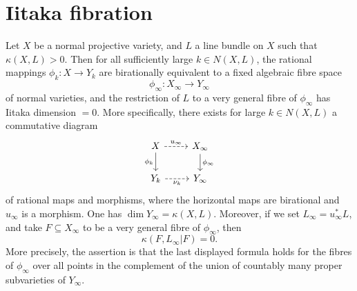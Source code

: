 \section{Iitaka fibration}

    \begin{theorem}\label{thm:Iitaka_fibration}
        Let \( X \) be a normal projective variety, and \( L \) a line bundle on \( X \) such that \( \kappa(X,L) > 0 \). Then for all sufficiently large \( k \in N(X,L) \), the rational mappings \( \phi_k : X \rightarrow Y_k \) are birationally equivalent to a fixed algebraic fibre space
        \[
        \phi_{\infty} : X_{\infty} \rightarrow Y_{\infty}
        \]
        of normal varieties, and the restriction of \( L \) to a very general fibre of \( \phi_{\infty} \) has Iitaka dimension \( = 0 \). More specifically, there exists for large \( k \in N(X,L) \) a commutative diagram
        \[
        \begin{tikzcd}
        X \arrow[d, "\phi_k"'] \arrow[r, dashed, "u_{\infty}"] & X_{\infty} \arrow[d, "\phi_{\infty}"] \\
        Y_k \arrow[r, dashed, "\nu_k"'] & Y_{\infty}
        \end{tikzcd}
        \]
        of rational maps and morphisms, where the horizontal maps are birational and \( u_{\infty} \) is a morphism. One has \(\dim Y_{\infty} = \kappa(X,L)\). Moreover, if we set \( L_{\infty} = u^{*}_{\infty}L \), and take \( F \subseteq X_{\infty} \) to be a very general fibre of \( \phi_{\infty} \), then
        \[
        \kappa(F, L_{\infty} | F) = 0.
        \]
        More precisely, the assertion is that the last displayed formula holds for the fibres of \( \phi_{\infty} \) over all points in the complement of the union of countably many proper subvarieties of \( Y_{\infty} \).
    \end{theorem}

